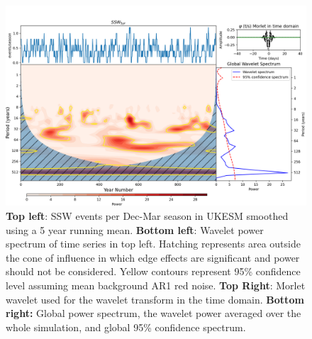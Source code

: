 \documentclass[wcd, manuscript]{copernicus}
\providecommand{\DIFaddbeginFL}{} %
\providecommand{\DIFaddendFL}{} %
\providecommand{\DIFdelbeginFL}{} %
\providecommand{\DIFdelendFL}{} %
\begin{document}
\begin{center}
\begin{figure}[h!]
\noindent\DIFdelbeginFL %
\DIFdelendFL \DIFaddbeginFL \includegraphics[width = 0.8\linewidth]{new_changed_figures/SSW_wavelet_5_yr_fig3_new_levels.png}
\DIFaddendFL \caption{\textbf{Top left}: SSW events per Dec-Mar season in UKESM smoothed using a 5 year running mean. \textbf{Bottom left}: Wavelet power spectrum of time series in top left. Hatching represents area outside the cone of influence in which edge effects are significant and power should not be considered. Yellow contours represent 95\% confidence level assuming mean background AR1 red noise. \textbf{Top Right}: Morlet wavelet used for the wavelet transform in the time domain. \textbf{Bottom right:} Global power spectrum, the wavelet power averaged over the whole simulation, and global 95\% confidence spectrum.}
\label{fig3}
\end{figure}
\end{center}
\end{document}
